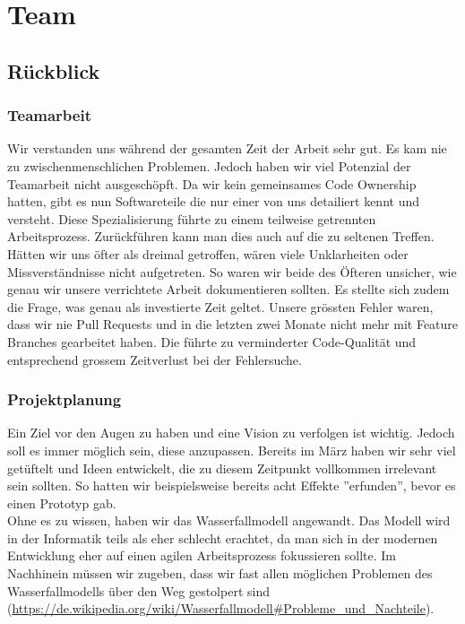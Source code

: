 \chapter{Team}

\section{Rückblick}

\subsection*{Teamarbeit}
Wir verstanden uns während der gesamten Zeit der Arbeit sehr gut. Es kam nie zu zwischenmenschlichen Problemen. Jedoch haben wir viel Potenzial der Teamarbeit nicht ausgeschöpft.
Da wir kein gemeinsames Code Ownership hatten, gibt es nun Softwareteile die nur einer von uns detailiert kennt und versteht. Diese Spezialisierung führte zu einem teilweise getrennten Arbeitsprozess. Zurückführen kann man dies auch auf die zu seltenen
Treffen. Hätten wir uns öfter als dreimal getroffen, wären viele Unklarheiten oder Missverständnisse nicht aufgetreten. So waren wir beide des Öfteren unsicher, wie genau wir unsere verrichtete Arbeit
dokumentieren sollten. Es stellte sich zudem die Frage, was genau als investierte Zeit geltet.
Unsere grössten Fehler waren, dass wir nie Pull Requests und in die letzten zwei Monate nicht mehr mit Feature Branches gearbeitet haben. Die führte zu verminderter Code-Qualität
und entsprechend grossem Zeitverlust bei der Fehlersuche.


\subsection*{Projektplanung}
Ein Ziel vor den Augen zu haben und eine Vision zu verfolgen ist wichtig. Jedoch soll es
immer möglich sein, diese anzupassen. Bereits im März haben wir sehr viel getüftelt und Ideen entwickelt, die zu diesem Zeitpunkt vollkommen irrelevant sein sollten.
So hatten wir beispielsweise bereits acht Effekte ''erfunden'', bevor es einen Prototyp gab.\\
Ohne es zu wissen, haben wir das Wasserfallmodell angewandt. Das Modell wird in der Informatik teils als eher schlecht erachtet, da man sich in der modernen
Entwicklung eher auf einen agilen Arbeitsprozess fokussieren sollte. Im Nachhinein müssen wir zugeben, dass wir fast allen möglichen Problemen des Wasserfallmodells
über den Weg gestolpert sind (\url{https://de.wikipedia.org/wiki/Wasserfallmodell#Probleme_und_Nachteile}).


